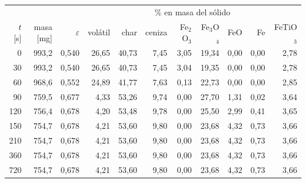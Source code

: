 \begin{tabular}{rrrrrrrrrrr}
    \hline
     &  &  & \multicolumn{8}{c}{\% en masa del sólido} \\
    $t$ [s] & masa [mg] & $\varepsilon$ & volátil & char & ceniza & Fe$_2$O$_3$ & Fe$_3$O$_4$ & FeO & Fe & FeTiO$_3$ \\
    \hline
    0 & 993,2 & 0,540 & 26,65 & 40,73 & 7,45 & 3,05 & 19,34 & 0,00 & 0,00 & 2,78 \\
    30 & 993,2 & 0,540 & 26,65 & 40,73 & 7,45 & 3,04 & 19,35 & 0,00 & 0,00 & 2,78 \\
    60 & 968,6 & 0,552 & 24,89 & 41,77 & 7,63 & 0,13 & 22,73 & 0,00 & 0,00 & 2,85 \\
    90 & 759,5 & 0,677 & 4,33 & 53,26 & 9,74 & 0,00 & 27,70 & 1,31 & 0,02 & 3,64 \\
    120 & 756,4 & 0,678 & 4,20 & 53,48 & 9,78 & 0,00 & 25,50 & 2,99 & 0,41 & 3,65 \\
    150 & 754,7 & 0,678 & 4,21 & 53,60 & 9,80 & 0,00 & 23,68 & 4,32 & 0,73 & 3,66 \\
    210 & 754,7 & 0,678 & 4,21 & 53,60 & 9,80 & 0,00 & 23,68 & 4,32 & 0,73 & 3,66 \\
    360 & 754,7 & 0,678 & 4,21 & 53,60 & 9,80 & 0,00 & 23,68 & 4,32 & 0,73 & 3,66 \\
    720 & 754,7 & 0,678 & 4,21 & 53,60 & 9,80 & 0,00 & 23,68 & 4,32 & 0,73 & 3,66 \\
    \hline
\end{tabular}
